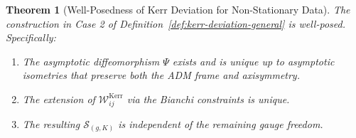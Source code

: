 \documentclass[12pt]{article}
\theoremstyle{plain}
\newtheorem{theorem}{Theorem}[section]
\theoremstyle{definition}
\theoremstyle{remark}
\begin{document}
\begin{theorem}[Well-Posedness of Kerr Deviation for Non-Stationary Data]\label{thm:well-posed-nonstat}
The construction in Case 2 of Definition~\ref{def:kerr-deviation-general} is well-posed. Specifically:
\begin{enumerate}[label=\textup{(\roman*)}]
    \item The asymptotic diffeomorphism $\Psi$ exists and is unique up to asymptotic isometries that preserve both the ADM frame and axisymmetry.
    \item The extension of $\mathcal{W}^{\mathrm{Kerr}}_{ij}$ via the Bianchi constraints is unique.
    \item The resulting $\mathcal{S}_{(g,K)}$ is independent of the remaining gauge freedom.
\end{enumerate}
\end{theorem}
\end{document}
